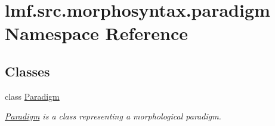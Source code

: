 \hypertarget{namespacelmf_1_1src_1_1morphosyntax_1_1paradigm}{\section{lmf.\+src.\+morphosyntax.\+paradigm Namespace Reference}
\label{namespacelmf_1_1src_1_1morphosyntax_1_1paradigm}
}
\subsection*{Classes}
\begin{DoxyCompactItemize}
\item 
class \hyperlink{classlmf_1_1src_1_1morphosyntax_1_1paradigm_1_1_paradigm}{Paradigm}
\begin{DoxyCompactList}\small\item\em \hyperlink{classlmf_1_1src_1_1morphosyntax_1_1paradigm_1_1_paradigm}{Paradigm} is a class representing a morphological paradigm. \end{DoxyCompactList}\end{DoxyCompactItemize}
